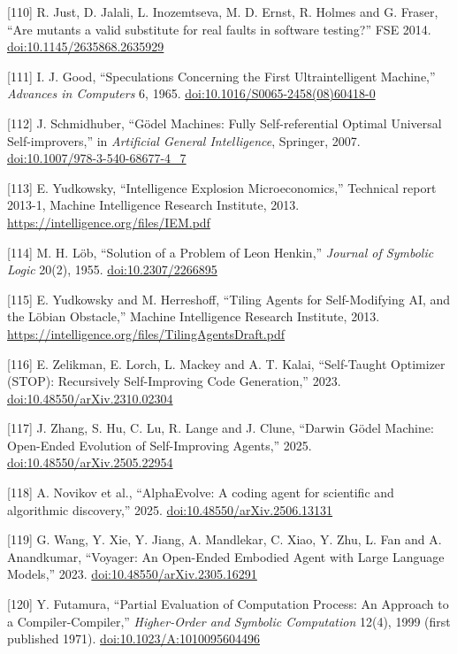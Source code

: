 \documentclass[10pt,letterpaper]{article}
\begin{document}
{[}110{]} R. Just, D. Jalali, L. Inozemtseva, M. D. Ernst, R. Holmes and
G. Fraser, ``Are mutants a valid substitute for real faults in software
testing?'' FSE 2014.
\href{https://doi.org/10.1145/2635868.2635929}{doi:10.1145/2635868.2635929}

{[}111{]} I. J. Good, ``Speculations Concerning the First
Ultraintelligent Machine,'' \emph{Advances in Computers} 6, 1965.
\href{https://doi.org/10.1016/S0065-2458(08)60418-0}{doi:10.1016/S0065-2458(08)60418-0}

{[}112{]} J. Schmidhuber, ``Gödel Machines: Fully Self-referential
Optimal Universal Self-improvers,'' in \emph{Artificial General
Intelligence}, Springer, 2007.
\href{https://doi.org/10.1007/978-3-540-68677-4_7}{doi:10.1007/978-3-540-68677-4\_7}

{[}113{]} E. Yudkowsky, ``Intelligence Explosion Microeconomics,''
Technical report 2013-1, Machine Intelligence Research Institute, 2013.
\url{https://intelligence.org/files/IEM.pdf}

{[}114{]} M. H. Löb, ``Solution of a Problem of Leon Henkin,''
\emph{Journal of Symbolic Logic} 20(2), 1955.
\href{https://doi.org/10.2307/2266895}{doi:10.2307/2266895}

{[}115{]} E. Yudkowsky and M. Herreshoff, ``Tiling Agents for
Self-Modifying AI, and the Löbian Obstacle,'' Machine Intelligence
Research Institute, 2013.
\url{https://intelligence.org/files/TilingAgentsDraft.pdf}

{[}116{]} E. Zelikman, E. Lorch, L. Mackey and A. T. Kalai,
``Self-Taught Optimizer (STOP): Recursively Self-Improving Code
Generation,'' 2023.
\href{https://doi.org/10.48550/arXiv.2310.02304}{doi:10.48550/arXiv.2310.02304}

{[}117{]} J. Zhang, S. Hu, C. Lu, R. Lange and J. Clune, ``Darwin Gödel
Machine: Open-Ended Evolution of Self-Improving Agents,'' 2025.
\href{https://doi.org/10.48550/arXiv.2505.22954}{doi:10.48550/arXiv.2505.22954}

{[}118{]} A. Novikov et al., ``AlphaEvolve: A coding agent for
scientific and algorithmic discovery,'' 2025.
\href{https://doi.org/10.48550/arXiv.2506.13131}{doi:10.48550/arXiv.2506.13131}

{[}119{]} G. Wang, Y. Xie, Y. Jiang, A. Mandlekar, C. Xiao, Y. Zhu, L.
Fan and A. Anandkumar, ``Voyager: An Open-Ended Embodied Agent with
Large Language Models,'' 2023.
\href{https://doi.org/10.48550/arXiv.2305.16291}{doi:10.48550/arXiv.2305.16291}

{[}120{]} Y. Futamura, ``Partial Evaluation of Computation Process: An
Approach to a Compiler-Compiler,'' \emph{Higher-Order and Symbolic
Computation} 12(4), 1999 (first published 1971).
\href{https://doi.org/10.1023/A:1010095604496}{doi:10.1023/A:1010095604496}
\end{document}
